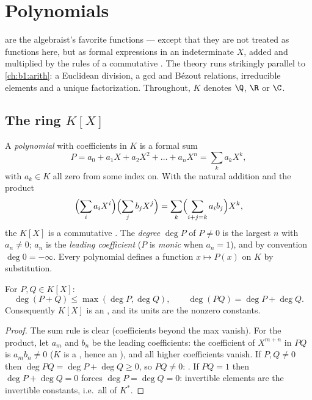 \chapter{Polynomials}\label{ch:b1:poly}

 are the algebraist's favorite functions --- except that
they are not treated as functions here, but as formal expressions in
an indeterminate $X$, added and multiplied by the rules of a
commutative . The theory runs strikingly parallel to
\cref{ch:b1:arith}: a Euclidean division, a gcd and Bézout relations,
irreducible elements and a unique factorization. Throughout, $K$
denotes $\Q$, $\R$ or $\C$.

\section{The ring $K[X]$}

\begin{definition}\label{def:b1:poly:def}
A \emph{polynomial} with coefficients in $K$ is a
formal sum
\[
P = a_0 + a_1 X + a_2 X^2 + \dots + a_n X^n
= \sum_{k} a_k X^k,
\]
with $a_k \in K$ all zero from some index on. With the natural
addition and the product
\[
\Bigl(\sum_i a_i X^i\Bigr)\Bigl(\sum_j b_j X^j\Bigr)
= \sum_k \Bigl(\sum_{i+j=k} a_i b_j\Bigr) X^k,
\]
the  $K[X]$ is a commutative . The \emph{degree} $\deg P$ of
$P \neq 0$ is the largest $n$ with $a_n \neq 0$; $a_n$ is the
\emph{leading coefficient} ($P$ is \emph{monic} when $a_n = 1$), and by convention $\deg 0 = -\infty$.
Every polynomial defines a function $x \mapsto P(x)$ on $K$ by
substitution.
\end{definition}

\begin{proposition}\label{prop:b1:poly:degree}
For $P, Q \in K[X]$:
\[
\deg(P + Q) \leq \max(\deg P, \deg Q),
\qquad
\deg(PQ) = \deg P + \deg Q .
\]
Consequently $K[X]$ is an , and its units are the
nonzero constants.
\end{proposition}

\begin{proof}
The sum rule is clear (coefficients beyond the max vanish). For the
product, let $a_m$ and $b_n$ be the leading coefficients: the
coefficient of $X^{m+n}$ in $PQ$ is $a_m b_n \neq 0$ ($K$ is a
, hence an ), and all higher coefficients vanish.
If $P, Q \neq 0$ then $\deg PQ = \deg P + \deg Q \geq 0$, so $PQ \neq
0$: . If $PQ = 1$ then $\deg P + \deg Q = 0$ forces
$\deg P = \deg Q = 0$: invertible elements are the invertible
constants, i.e.\ all of $K^*$.
\end{proof}

